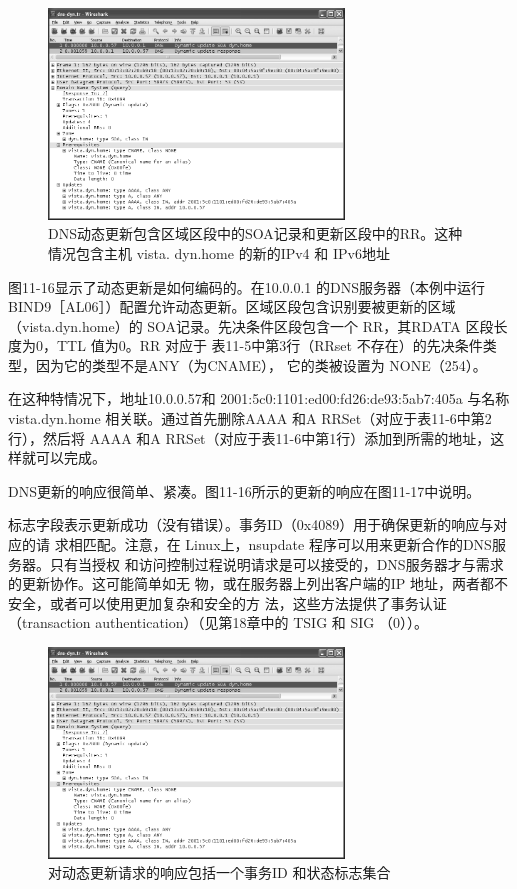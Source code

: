 \begin{figure}[!htb]
    \centering
	\includegraphics[width=0.7\textwidth]{imgs/11/11-16.png}
	\caption{DNS动态更新包含区域区段中的SOA记录和更新区段中的RR。这种情况包含主机 vista.
            dyn.home 的新的IPv4 和 IPv6地址}
\end{figure}

图11-16显示了动态更新是如何编码的。在10.0.0.1 的DNS服务器（本例中运行
BIND9［AL06］）配置允许动态更新。区域区段包含识别要被更新的区域（vista.dyn.home）的
SOA记录。先决条件区段包含一个 RR，其RDATA 区段长度为0，TTL 值为0。RR 对应于
表11-5中第3行（RRset 不存在）的先决条件类型，因为它的类型不是ANY（为CNAME），
它的类被设置为 NONE（254）。

在这种特情况下，地址10.0.0.57和 2001:5c0:1101:ed00:fd26:de93:5ab7:405a 与名称
vista.dyn.home 相关联。通过首先删除AAAA 和A RRSet（对应于表11-6中第2行），然后将
AAAA 和A RRSet（对应于表11-6中第1行）添加到所需的地址，这样就可以完成。

DNS更新的响应很简单、紧凑。图11-16所示的更新的响应在图11-17中说明。

标志字段表示更新成功（没有错误）。事务ID（0x4089）用于确保更新的响应与对应的请
求相匹配。注意，在 Linux上，nsupdate 程序可以用来更新合作的DNS服务器。只有当授权
和访问控制过程说明请求是可以接受的，DNS服务器才与需求的更新协作。这可能简单如无
物，或在服务器上列出客户端的IP 地址，两者都不安全，或者可以使用更加复杂和安全的方
法，这些方法提供了事务认证 （transaction authentication）（见第18章中的 TSIG 和 SIG （0））。

\begin{figure}[!htb]
    \centering
	\includegraphics[width=0.7\textwidth]{imgs/11/11-16.png}
	\caption{对动态更新请求的响应包括一个事务ID 和状态标志集合}
\end{figure}


